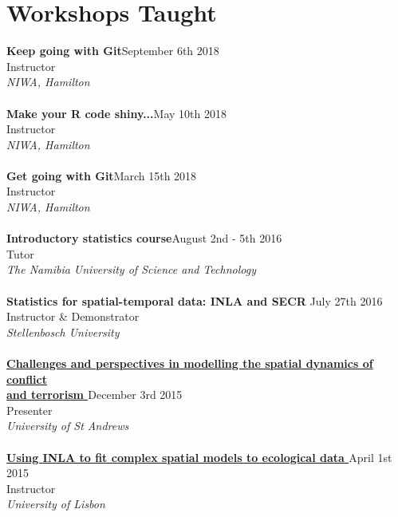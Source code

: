 \documentclass[10pt,letter]{article}
\begin{document}
\section*{Workshops Taught}
\vspace{1mm}
{\textbf{Keep going with Git}}\hfill September 6th 2018\\
Instructor \\
 {\sl NIWA, Hamilton}\\
 \hdashrule[0.5ex]{4cm}{1pt}{1pt}\\
{\textbf{Make your R code shiny...}}\hfill May 10th 2018\\
Instructor \\
 {\sl NIWA, Hamilton}\\
 \hdashrule[0.5ex]{4cm}{1pt}{1pt}\\
{\textbf{Get going with Git}}\hfill March 15th 2018\\
Instructor \\
 {\sl NIWA, Hamilton}\\
 \hdashrule[0.5ex]{4cm}{1pt}{1pt}\\
{\textbf{Introductory statistics course}}\hfill August 2nd - 5th 2016\\
Tutor \\
 {\sl The Namibia University of Science and Technology }\\
 \hdashrule[0.5ex]{4cm}{1pt}{1pt}\\
 {\textbf{{Statistics for spatial-temporal data: INLA and SECR }}} \hfill July 27th 2016\\
 Instructor \& Demonstrator\\
 {\sl Stellenbosch University }\\
 \hdashrule[0.5ex]{4cm}{1pt}{1pt}\\
 {\textbf{\href{http://modelling.wp.st-andrews.ac.uk/}{Challenges and perspectives in modelling the spatial dynamics of conflict\\ and terrorism }}} \hfill December 3rd 2015\\
 Presenter\\
 {\sl University of St Andrews}\\
 \hdashrule[0.5ex]{4cm}{1pt}{1pt}\\
{\textbf{\href{http://www.startfactor.pt/training1.html}{Using INLA to fit complex spatial models to ecological data }}} \hfill April 1st 2015\\
 Instructor\\
 {\sl University of Lisbon}\\
 \hdashrule[0.5ex]{4cm}{1pt}{1pt}\\
\end{document}
